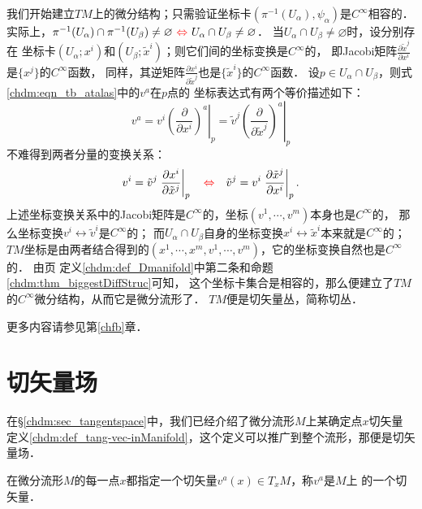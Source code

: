 我们开始建立$TM$上的微分结构；只需验证坐标卡$(\pi^{-1} (U_\alpha),\psi_\alpha)$是$C^\infty$相容的．
实际上，$\pi^{-1} (U_\alpha) \cap \pi^{-1} (U_\beta) \neq \varnothing 
{\  \color{red}\Leftrightarrow \   } U_\alpha \cap U_\beta \neq \varnothing$．
当$U_\alpha \cap U_\beta \neq \varnothing$时，设分别存在
坐标卡$(U_\alpha;x^i)$和$(U_\beta;\tilde{x}^i)$；则它们间的坐标变换是$C^\infty$的，
即Jacobi矩阵$\frac{\partial \tilde{x}^j}{\partial {x}^i}$是$\{x^j\}$的$C^\infty$函数，
同样，其逆矩阵$\frac{\partial {x}^i}{\partial \tilde{x}^j}$也是$\{\tilde{x}^i\}$的$C^\infty$函数．
设$p \in U_\alpha \cap U_\beta$，则式\eqref{chdm:eqn_tb_atalas}中的$v^a$在$p$点的
坐标表达式有两个等价描述如下：
\begin{equation}
    v^a = v^i \left. \left(\frac{\partial }{\partial x^i}\right)^a \right | _p
        = \tilde{v}^j \left. \left(\frac{\partial }{\partial \tilde{x}^j}\right)^a  \right | _p
\end{equation}
不难得到两者分量的变换关系：
\begin{equation}\label{chdm:eqn_tbv}
    v^i = \tilde{v}^j \left. \frac{\partial {x}^i}{\partial \tilde{x}^j}  \right | _p
    {\quad \color{red}\Leftrightarrow \quad}
    \tilde{v}^j = {v}^i \left. \frac{\partial \tilde{x}^j}{\partial {x}^i}  \right | _p .
\end{equation}
上述坐标变换关系中的Jacobi矩阵是$C^\infty$的，坐标$(v^1,\cdots,v^m)$本身也是$C^\infty$的，
那么坐标变换$v^i \leftrightarrow \tilde{v}^i$是$C^\infty$的；
而$U_\alpha \cap U_\beta$自身的坐标变换$x^i \leftrightarrow \tilde{x}^i$本来就是$C^\infty$的；
$TM$坐标是由两者结合得到的$(x^1,\cdots,x^m,v^1,\cdots,v^m)$，它的坐标变换自然也是$C^\infty$的．
由\pageref{chdm:def_Dmanifold}页
定义\ref{chdm:def_Dmanifold}中第二条和命题\ref{chdm:thm_biggestDiffStruc}可知，
这个坐标卡集合是{\kaishu 相容的}，那么便建立了$TM$的$C^\infty$微分结构，从而它是微分流形了．
$TM$便是切矢量丛，简称切丛．

更多内容请参见第\ref{chfb}章．



\section{切矢量场}\label{chdm:sec_tangent-vector-field}
在\S\ref{chdm:sec_tangentspace}中，我们已经介绍了微分流形$M$上某确定点$x$切矢量
定义\ref{chdm:def_tang-vec-inManifold}，这个定义可以推广到整个流形，那便是切矢量场．
\begin{definition}\label{chdm:def_tangent-vector-field}
    在微分流形$M$的每一点$x$都指定一个切矢量$v^a(x)\in T_xM$，称$v^a$是$M$上
    的一个{\heiti 切矢量}．
\end{definition}


